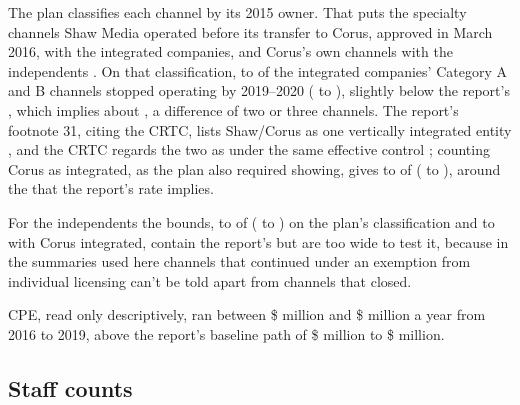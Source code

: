 The plan classifies each channel by its 2015 owner. That puts the \lttvShawMediaN{} specialty channels Shaw Media operated before its transfer to Corus, approved in March 2016, with the integrated companies, and Corus's own channels with the independents \citep{crtc2016chart32h, crtc2016chart32i, crtc2016decision110}. On that classification, \lttvClosVIPlanClosed{} to \lttvClosVIPlanUpper{} of the integrated companies' \lttvClosVIPlanN{} Category A and B channels stopped operating by 2019--2020 (\lttvClosVIPlanLo{} to \lttvClosVIPlanHi{}), slightly below the report's \lttvReportClosuresVI{}, which implies about \lttvClosVIPlanImplied{}, a difference of two or three channels. The report's footnote 31, citing the CRTC, lists Shaw/Corus as one vertically integrated entity \citep[n.~31]{nordicity2015television}, and the CRTC regards the two as under the same effective control \citep{crtc2016decision110}; counting Corus as integrated, as the plan also required showing, gives \lttvClosVICorusClosed{} to \lttvClosVICorusUpper{} of \lttvClosVICorusN{} (\lttvClosVICorusLo{} to \lttvClosVICorusHi{}), around the \lttvClosVICorusImplied{} that the report's rate implies.

For the independents the bounds, \lttvClosIndPlanClosed{} to \lttvClosIndPlanUpper{} of \lttvClosIndPlanN{} (\lttvClosIndPlanLo{} to \lttvClosIndPlanHi{}) on the plan's classification and \lttvClosIndCorusLo{} to \lttvClosIndCorusHi{} with Corus integrated, contain the report's \lttvReportClosuresIndep{} but are too wide to test it, because in the summaries used here channels that continued under an exemption from individual licensing can't be told apart from channels that closed.

CPE, read only descriptively, ran between \$\lttvCPEObsMin{} million and \$\lttvCPEObsMax{} million a year from 2016 to 2019, above the report's baseline path of \$\lttvCPEBaseMin{} million to \$\lttvCPEBaseMax{} million.

\subsection{Staff counts}

